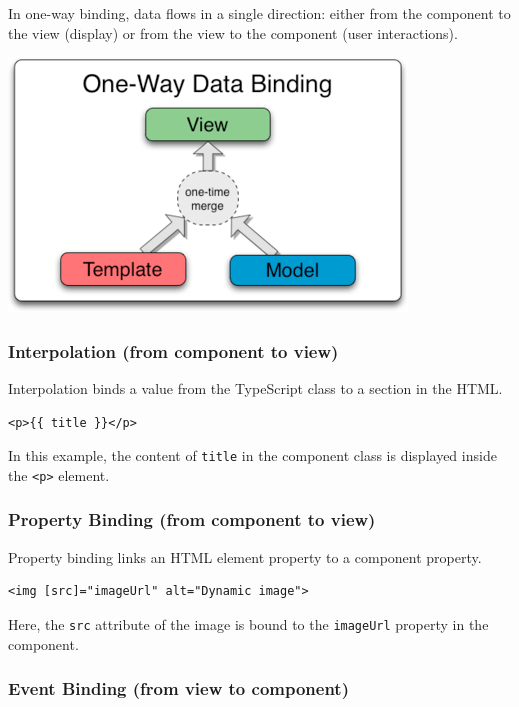 \documentclass{article}
\begin{document}
In one-way binding, data flows in a single direction: either from the component to the view (display) or from the view to the component (user interactions).
\begin{tcolorbox}[colframe=black!70, colback=white, title=Figure 5: One-way Data Binding, fonttitle=\bfseries]
\centering
\includegraphics[width=\textwidth]{images/angularjs-one-way-data-binding.png}
\end{tcolorbox}

\subsubsection{Interpolation (from component to view)}

Interpolation binds a value from the TypeScript class to a section in the HTML.
\begin{verbatim}
<p>{{ title }}</p>
\end{verbatim}
In this example, the content of \texttt{title} in the component class is displayed inside the \texttt{<p>} element.

\subsubsection{Property Binding (from component to view)}

Property binding links an HTML element property to a component property.
\begin{verbatim}
<img [src]="imageUrl" alt="Dynamic image">
\end{verbatim}
Here, the \texttt{src} attribute of the image is bound to the \texttt{imageUrl} property in the component.

\subsubsection{Event Binding (from view to component)}
\end{document}
